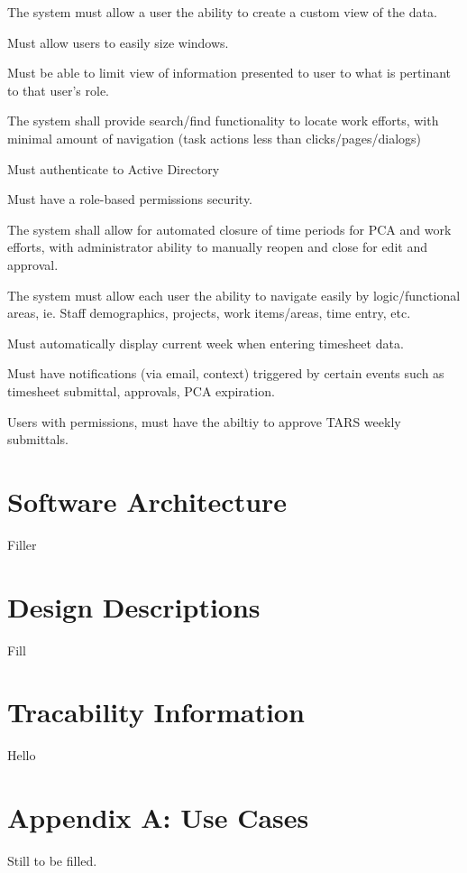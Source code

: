 \documentclass[letterpaper]{article}
\begin{document}
The system must allow a user the ability to create a custom view of the data.

Must allow users to easily size windows.

Must be able to limit view of information presented to user to what is pertinant to that user's role.

The system shall provide search/find functionality to locate work efforts, with minimal amount of navigation (task actions less than clicks/pages/dialogs)

Must authenticate to Active Directory

Must have a role-based permissions security.

The system shall allow for automated closure of time periods for PCA and work efforts, with administrator ability to manually reopen and close for edit and approval.

The system must allow each user the ability to navigate easily by logic/functional areas, ie. Staff demographics, projects, work items/areas, time entry, etc.

Must automatically display current week when entering timesheet data.

Must have notifications (via email, context) triggered by certain events such as timesheet submittal, approvals, PCA expiration. 

Users with permissions, must have the abiltiy to approve TARS weekly submittals.

\section{Software Architecture} 
Filler
\section{Design Descriptions}
Fill
\section{Tracability Information}
Hello
\section{Appendix A: Use Cases} 
Still to be filled.
\end{document}
